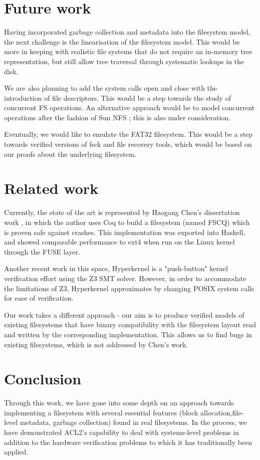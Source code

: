\documentclass[format=sigconf,review=true]{acmart}
\begin{document}
\section{Future work}
Having incorporated garbage collection and metadata into the
filesystem model, the next challenge is the linearisation of the
filesystem model. This would be more in keeping
with realistic file systems that do not require an in-memory tree
representation, but still allow tree traversal through systematic
lookups in the disk.

We are also planning to add the system calls open and close with the
introduction of file descriptors. This would be a step towards the
study of concurrent FS operations. An alternative approach would be to
model concurrent operations after the fashion of Sun NFS
\cite{sandberg1985design}; this is also under consideration.

Eventually, we would like to emulate the FAT32 filesystem. This would
be a step towards verified versions of fsck and file recovery tools,
which would be based on our proofs about the underlying filesystem.

\section{Related work}
Currently, the state of the art is represented by Haogang
Chen's dissertation work \cite{DBLP:conf/usenix/ChenZCCKZ16}, in which
the author uses Coq to build a filesystem (named FSCQ) which is proven
safe against crashes. This implementation was exported into Haskell,
and showed comparable performance to ext4 when run on the Linux kernel
through the FUSE layer.

Another recent work in this space, Hyperkernel
\cite{Nelson:2017:HPV:3132747.3132748} is a "push-button" kernel verification
effort using the Z3 SMT solver. However, in order to accommodate the
limitations of Z3, Hyperkernel approximates by changing POSIX system
calls for ease of verification.

Our work takes a different approach - our aim is to produce verified
models of existing filesystems that have binary compatibility with the
filesystem layout read and written by the corresponding
implementation. This allows us to find bugs in existing filesystems,
which is not addressed by Chen's work.

\section{Conclusion}
Through this work, we have gone into some depth on an approach towards
implementing a filesystem with several essential features (block
allocation,file-level metadata, garbage collection) found in real
filesystems. In the process, we have demonstrated ACL2's capability to
deal with systems-level problems in addition to the hardware
verification problems to which it has traditionally been applied.
\end{document}
